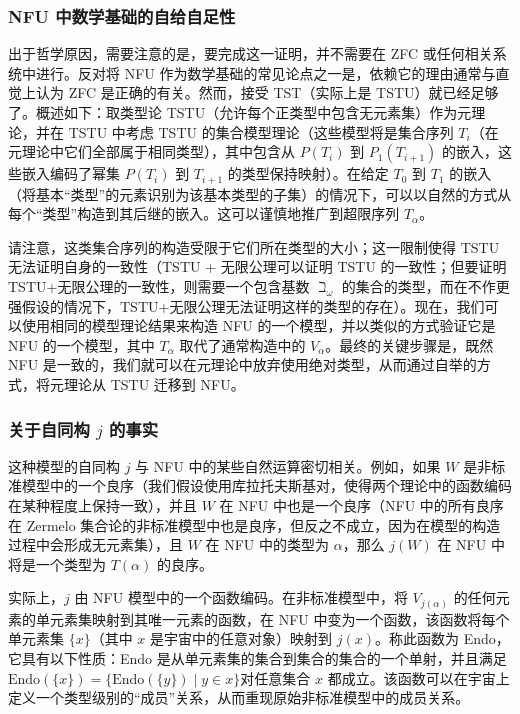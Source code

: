 \subsubsection{NFU 中数学基础的自给自足性}
出于哲学原因，需要注意的是，要完成这一证明，并不需要在 ZFC 或任何相关系统中进行。反对将 NFU 作为数学基础的常见论点之一是，依赖它的理由通常与直觉上认为 ZFC 是正确的有关。然而，接受 TST（实际上是 TSTU）就已经足够了。概述如下：取类型论 TSTU（允许每个正类型中包含无元素集）作为元理论，并在 TSTU 中考虑 TSTU 的集合模型理论（这些模型将是集合序列 \(T_i\)（在元理论中它们全部属于相同类型），其中包含从 \(P(T_i)\) 到 \(P_1(T_{i+1})\) 的嵌入，这些嵌入编码了幂集 \(P(T_i)\) 到 \(T_{i+1}\) 的类型保持映射）。在给定 \(T_0\) 到 \(T_1\) 的嵌入（将基本“类型”的元素识别为该基本类型的子集）的情况下，可以以自然的方式从每个“类型”构造到其后继的嵌入。这可以谨慎地推广到超限序列 \(T_\alpha\)。

请注意，这类集合序列的构造受限于它们所在类型的大小；这一限制使得 TSTU 无法证明自身的一致性（TSTU + 无限公理可以证明 TSTU 的一致性；但要证明 TSTU+无限公理的一致性，则需要一个包含基数 \( \beth_{\omega} \) 的集合的类型，而在不作更强假设的情况下，TSTU+无限公理无法证明这样的类型的存在）。现在，我们可以使用相同的模型理论结果来构造 NFU 的一个模型，并以类似的方式验证它是 NFU 的一个模型，其中 \( T_{\alpha} \) 取代了通常构造中的 \( V_{\alpha} \)。最终的关键步骤是，既然 NFU 是一致的，我们就可以在元理论中放弃使用绝对类型，从而通过自举的方式，将元理论从 TSTU 迁移到 NFU。
\subsubsection{关于自同构 \( j \) 的事实}
这种模型的自同构 \( j \) 与 NFU 中的某些自然运算密切相关。例如，如果 \( W \) 是非标准模型中的一个良序（我们假设使用库拉托夫斯基对，使得两个理论中的函数编码在某种程度上保持一致），并且 \( W \) 在 NFU 中也是一个良序（NFU 中的所有良序在 Zermelo 集合论的非标准模型中也是良序，但反之不成立，因为在模型的构造过程中会形成无元素集），且 \( W \) 在 NFU 中的类型为 \( \alpha \)，那么 \( j(W) \) 在 NFU 中将是一个类型为 \( T(\alpha) \) 的良序。  

实际上，\( j \) 由 NFU 模型中的一个函数编码。在非标准模型中，将 \( V_{j(\alpha)} \) 的任何元素的单元素集映射到其唯一元素的函数，在 NFU 中变为一个函数，该函数将每个单元素集 \(\{x\}\)（其中 \( x \) 是宇宙中的任意对象）映射到 \( j(x) \)。称此函数为 Endo，它具有以下性质：Endo 是从单元素集的集合到集合的集合的一个单射，并且满足\(\text{Endo}(\{x\}) = \{\text{Endo}(\{y\}) \mid y \in x\}\)对任意集合 \( x \) 都成立。该函数可以在宇宙上定义一个类型级别的“成员”关系，从而重现原始非标准模型中的成员关系。
